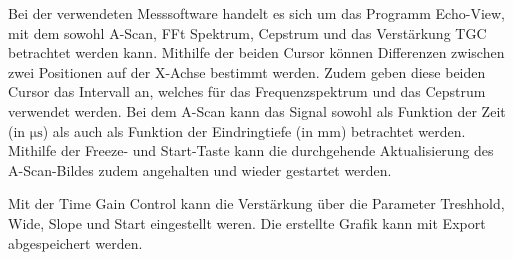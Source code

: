 Bei der verwendeten Messsoftware handelt es sich um das Programm Echo-View, mit
dem sowohl A-Scan, FFt Spektrum, Cepstrum und das Verstärkung TGC betrachtet
werden kann. Mithilfe der beiden Cursor können Differenzen zwischen zwei Positionen
auf der X-Achse bestimmt werden. Zudem geben diese beiden Cursor das Intervall
an, welches für das Frequenzspektrum und das Cepstrum verwendet werden.
Bei dem A-Scan kann das Signal sowohl als Funktion der Zeit (in $\si{\micro\second}$)
als auch als Funktion der Eindringtiefe (in mm) betrachtet werden. Mithilfe der
Freeze- und Start-Taste kann die durchgehende Aktualisierung des A-Scan-Bildes
zudem angehalten und wieder gestartet werden.

Mit der Time Gain Control kann die Verstärkung über die Parameter Treshhold, Wide,
Slope und Start eingestellt weren. Die erstellte Grafik kann mit Export abgespeichert
werden.

